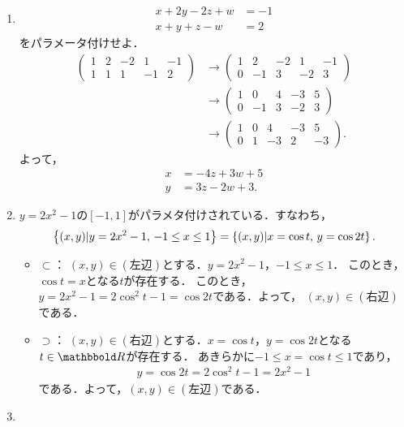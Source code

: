 \documentclass[9pt]{ltjsarticle}
\theoremstyle{break}
\theoremstyle{break}
\theoremstyle{break}
\theoremstyle{break}
\theoremstyle{break}
\theoremstyle{break}
\theoremstyle{break}
\theoremstyle{break}
\theoremstyle{break}
\theoremstyle{break}
\theoremstyle{break}
\theoremstyle{break}
\theoremstyle{break}
\theoremstyle{break}
\theoremstyle{break}
\theoremstyle{nonumberbreak}
\theoremstyle{nonumberbreak}
\begin{document}
\begin{enumerate}[label=(問題\arabic*)]
 \item
\begin{align}
 x + 2 y -2 z + w &= -1\\
 x+y+z-w& =2
\end{align}
をパラメータ付けせよ．
\begin{align}
\begin{pmatrix}
 1 & 2 & -2 & 1 & -1\\
 1&1 &1 &-1 & 2
\end{pmatrix}
&\to
\begin{pmatrix}
 1 & 2 & -2 & 1 & -1\\
 0&-1 &3 &-2 & 3
\end{pmatrix} \\
&\to
\begin{pmatrix}
 1 & 0 & 4 & -3 & 5\\
 0&-1 &3 &-2 & 3
\end{pmatrix} \\
 &\to
\begin{pmatrix}
 1 & 0 & 4 & -3 & 5\\
 0&1 &-3 &2 & -3
\end{pmatrix} .
\end{align}
よって，
\begin{align}
 x &= -4z + 3w + 5\\
 y& = 3z -2w + 3.
\end{align}
 \item
$y=2x^2-1$の$[-1,1]$がパラメタ付けされている．すなわち，
\begin{align}
 \left\{(x,y)| y=2x^2-1,\, -1 \le x \le 1\right\}
=
\left\{(x,y) | x=\cos t,\, y = \cos 2t\right\}.
\end{align}
\begin{itemize}
 \item $\subset$：
$(x,y)\in (左辺)$とする．$y=2x^2-1$，$-1\le x \le 1$．
このとき，$\cos t = x$となる$t$が存在する．
このとき，$y=2x^2-1=2\cos^2 t - 1 = \cos 2t$である．よって，
$(x,y)\in (右辺)$である．
 \item $\supset$：
$(x,y)\in (右辺)$とする．$x=\cos t$，$y=\cos 2t$となる$t\in \R$が存在する．
あきらかに$-1\le x = \cos t \le 1$であり，
\begin{align}
 y = \cos 2t  = 2\cos^2 t-1 = 2x^2 -1
\end{align}
である．よって，$(x,y)\in (左辺)$である．
\end{itemize}
 \item
\begin{align}

\end{align}
\end{enumerate}
\end{document}

